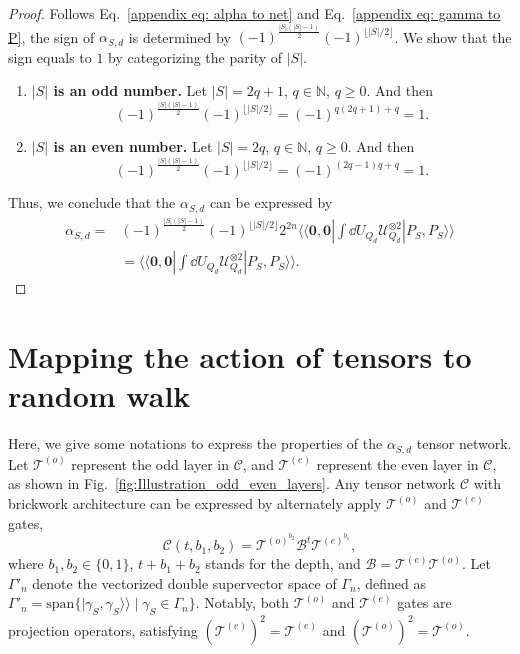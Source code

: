 \documentclass[showpacs,onecolumn,aps,prx,long bibliography,superscriptaddress,notitlepage]{revtex4-1}
\newcommand{\supket}[1]{|#1 \rangle\rangle}
\newcommand{\supbra}[1]{\langle\langle #1 |}
\newcommand{\floor}[1]{\lfloor #1 \rfloor}
\newcommand{\Tcal}{\mathcal{T}}
\begin{document}
\begin{proof}
    Follows Eq.~\eqref{appendix eq: alpha to net} and Eq.~\eqref{appendix eq: gamma to P}, 
    the sign of $\alpha_{S,d}$ is determined by $(-1)^{\frac{|S|(|S|-1)}{2}} (-1)^{\floor{|S|/2}}$. 
    We show that the sign equals to $1$ by categorizing the parity of $|S|$. 
    \begin{enumerate}
        \item \textbf{$|S|$ is an odd number.} Let $|S| = 2q+1$, $ q\in \mathbb{N}$, $q\geq 0$. And then
        \begin{equation}
            (-1)^{\frac{|S|(|S|-1)}{2}} (-1)^{\floor{|S|/2}} = (-1)^{q(2q+1)+q} = 1.
        \end{equation}
        \item \textbf{$|S|$ is an even number.} Let $|S| = 2q$, $ q\in \mathbb{N}$, $q\geq 0$. And then
        \begin{equation}
            (-1)^{\frac{|S|(|S|-1)}{2}} (-1)^{\floor{|S|/2}} = (-1)^{(2q-1)q+q} = 1.
        \end{equation}
    \end{enumerate}
Thus, we conclude that the $\alpha_{S,d}$ can be expressed by 
\begin{align}
    \alpha_{S,d}=& (-1)^{\frac{|S|(|S|-1)}{2}} (-1)^{\floor{|S|/2}}  2^{2n}  \supbra{\bm 0,\bm 0}  \int\dd U_{Q_d} \mathcal{U}_{Q_d}^{\otimes 2} \supket{P_S,P_S}\\
    &= \supbra{\bm 0,\bm 0}  \int\dd U_{Q_d} \mathcal{U}_{Q_d}^{\otimes 2} \supket{P_S,P_S} .
\end{align}
\end{proof}




\section{Mapping the action of tensors to random walk}
\label{sec: Mapping the action of tensors to random walk}

Here, we give some notations to express the properties of the $\alpha_{S,d}$ tensor network. Let $\Tcal^{(o)}$ represent the odd layer in $\mathcal{C}$, and $\Tcal^{(e)}$ represent the even layer in $\mathcal{C}$, as shown in Fig.~\ref{fig:Illustration_odd_even_layers}. 
Any tensor network $\mathcal{C}$ with brickwork architecture can be expressed by alternately apply $\Tcal^{(o)}$ and $\Tcal^{(e)}$ gates, 
\begin{equation}
\mathcal{C} \left(t, b_1, b_2\right)=\Tcal^{(o)^{b_2}}\mathcal{B}^t \Tcal^{(e)^{b_1}}, 
\end{equation}
where $b_1, b_2 \in\{0,1\}$, $t+b_1+b_2$ stands for the depth, and $\mathcal{B = }\Tcal^{(e)}\Tcal^{(o)}$. 
Let $\Gamma'_n$ denote the vectorized double supervector space of $\Gamma_n$, defined as $\Gamma'_n = \text{span}\{\supket{\gamma_S, \gamma_S} \mid \gamma_S \in \Gamma_n \}$. Notably, both $\Tcal^{(o)}$ and $\Tcal^{(e)}$ gates are projection operators, satisfying $(\Tcal^{(e)})^2 = \Tcal^{(e)}$ and $(\Tcal^{(o)})^2 = \Tcal^{(o)}$. 
\end{document}
